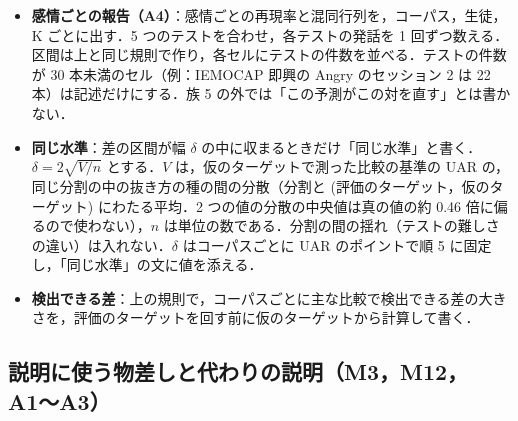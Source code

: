 \documentclass[11pt,a4paper]{ltjsarticle}
\begin{document}
\begin{itemize}
\begin{itemize}
    \item 族 3：生徒 4 種 × K 3 つで，提案と，同じ情報を受け取る比較相手のうち仮のターゲットで最も良かったものとの差．12 個．相手の候補は，温度つき蒸留（教師と生徒の両方に温度），一致した発話だけの疑似ラベル，自分の予測と混ぜる手（Zhang ほか 2021 の硬いラベルとしきい値の形），柔らかい共訓練，共正則化の 5 つで，実験 1 の設計で固定した（2026-11-04．xMUDA 型は勾配法で束の組み方で値が変わり，族の p 値の前提が成り立たないので，実験 2 の別の表で共通の単位の上で比べる）．
    \item 族 4：生徒 4 種 × K 3 つで，選択ありと選択なしの差．12 個．
    \item 族 5：生徒 4 種 × 感情の対 6 つで，K=5 の提案と比較の基準の，対ごとの方向の誤りの差．24 個（A4）．
  \end{itemize}
  \item \textbf{感情ごとの報告（A4）}：感情ごとの再現率と混同行列を，コーパス，生徒，K ごとに出す．5 つのテストを合わせ，各テストの発話を 1 回ずつ数える．区間は上と同じ規則で作り，各セルにテストの件数を並べる．テストの件数が 30 本未満のセル（例：IEMOCAP 即興の Angry のセッション 2 は 22 本）は記述だけにする．族 5 の外では「この予測がこの対を直す」とは書かない．
  \item \textbf{同じ水準}：差の区間が幅 $\delta$ の中に収まるときだけ「同じ水準」と書く．$\delta = 2\sqrt{V/n}$ とする．$V$ は，仮のターゲットで測った比較の基準の UAR の，同じ分割の中の抜き方の種の間の分散（分割と (評価のターゲット，仮のターゲット) にわたる平均．2 つの値の分散の中央値は真の値の約 0.46 倍に偏るので使わない），$n$ は単位の数である．分割の間の揺れ（テストの難しさの違い）は入れない．$\delta$ はコーパスごとに UAR のポイントで順 5 に固定し，「同じ水準」の文に値を添える．
  \item \textbf{検出できる差}：上の規則で，コーパスごとに主な比較で検出できる差の大きさを，評価のターゲットを回す前に仮のターゲットから計算して書く．
\end{itemize}

\subsection{説明に使う物差しと代わりの説明（M3，M12，A1〜A3）}
\end{document}

